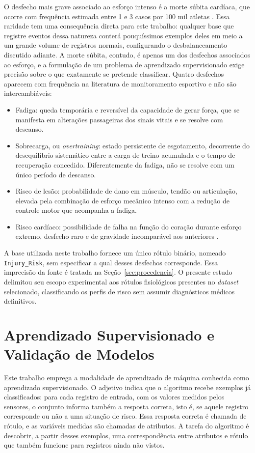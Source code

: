 O desfecho mais grave associado ao esforço intenso é a morte súbita cardíaca, que ocorre com frequência estimada entre 1 e 3 casos por 100 mil atletas \cite{mckelvie2024morte}. Essa raridade tem uma consequência direta para este trabalho: qualquer base que registre eventos dessa natureza conterá pouquíssimos exemplos deles em meio a um grande volume de registros normais, configurando o desbalanceamento discutido adiante. A morte súbita, contudo, é apenas um dos desfechos associados ao esforço, e a formulação de um problema de aprendizado supervisionado exige precisão sobre o que exatamente se pretende classificar. Quatro desfechos aparecem com frequência na literatura de monitoramento esportivo e não são intercambiáveis:

\begin{itemize}
    \item Fadiga: queda temporária e reversível da capacidade de gerar força, que se manifesta em alterações passageiras dos sinais vitais e se resolve com descanso.
    \item Sobrecarga, ou \textit{overtraining}: estado persistente de esgotamento, decorrente do desequilíbrio sistemático entre a carga de treino acumulada e o tempo de recuperação concedido. Diferentemente da fadiga, não se resolve com um único período de descanso.
    \item Risco de lesão: probabilidade de dano em músculo, tendão ou articulação, elevada pela combinação de esforço mecânico intenso com a redução de controle motor que acompanha a fadiga.
    \item Risco cardíaco: possibilidade de falha na função do coração durante esforço extremo, desfecho raro e de gravidade incomparável aos anteriores \cite{meyer2022}.
\end{itemize}

A base utilizada neste trabalho fornece um único rótulo binário, nomeado \texttt{Injury\_Risk}, sem especificar a qual desses desfechos corresponde. Essa imprecisão da fonte é tratada na Seção~\ref{sec:procedencia}. O presente estudo delimitou seu escopo experimental aos rótulos fisiológicos presentes no \textit{dataset} selecionado, classificando os perfis de risco sem assumir diagnósticos médicos definitivos.

\section{Aprendizado Supervisionado e Validação de Modelos}

Este trabalho emprega a modalidade de aprendizado de máquina conhecida como aprendizado supervisionado. O adjetivo indica que o algoritmo recebe exemplos já classificados: para cada registro de entrada, com os valores medidos pelos sensores, o conjunto informa também a resposta correta, isto é, se aquele registro corresponde ou não a uma situação de risco. Essa resposta correta é chamada de rótulo, e as variáveis medidas são chamadas de atributos. A tarefa do algoritmo é descobrir, a partir desses exemplos, uma correspondência entre atributos e rótulo que também funcione para registros ainda não vistos.

